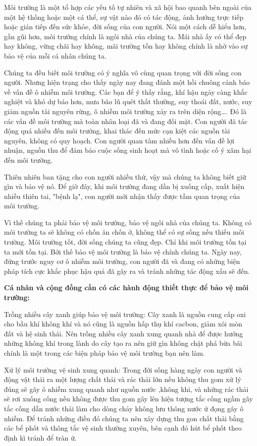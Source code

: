 \begin{enumerate}[label=\bfseries Câu \arabic*:]
{		Môi trường là một tổ hợp các yếu tố tự nhiên và xã hội bao quanh bên ngoài của một hệ thống hoặc một cá thể, sự vật nào đó có tác động, ảnh hưởng trực tiếp hoặc gián tiếp đến sức khỏe, đời sống của con người. Nói một cách dễ hiểu hơn, gần gũi hơn, môi trường chính là ngôi nhà của chúng ta. Mái nhà ấy có thể đẹp hay không, vững chãi hay không, mãi trường tồn hay không chính là nhờ vào sự bảo vệ của mỗi cá nhân chúng ta.
		
		
		
		Chúng ta đều biết môi trường có ý nghĩa vô cùng quan trọng với đời sống con người. Nhưng hiện trạng cho thấy ngày nay đang đánh một hồi chuông cảnh báo về vấn đề ô nhiễm môi trường. Các bạn để ý thấy rằng, khí hậu ngày càng khắc nghiệt và khó dự báo hơn, mưa bão lũ quét thất thường, suy thoái đất, nước, suy giảm nguồn tài nguyên rừng, ô nhiễm môi trường xảy ra trên diện rộng…. Đó là các vấn đề môi trường mà toàn nhân loại đã và đang đối mặt. Con người đã tác động quá nhiều đến môi trường, khai thác đến mức cạn kiệt các nguồn tài nguyên, không có quy hoạch. Con người quan tâm nhiều hơn đến vấn đề lợi nhuận, nguồn thu để đảm bảo cuộc sống sinh hoạt mà vô tình hoặc cố ý xâm hại đến môi trường.
		
		Thiên nhiên ban tặng cho con người nhiều thứ, vậy mà chúng ta không biết giữ gìn và bảo vệ nó. Để giờ đây, khi môi trường đang dần bị xuống cấp, xuất hiện nhiều thiên tai, "bệnh lạ", con người mới nhận thấy được tầm quan trọng của môi trường.
		
		Vì thế chúng ta phải bảo vệ môi trường, bảo vệ ngôi nhà của chúng ta. Không có môi trường ta sẽ không có chốn ăn chốn ở, không thể có sự sống nếu thiếu môi trường. Môi trường tốt, đời sống chúng ta cũng đẹp. Chỉ khi môi trường tồn tại ta mới tồn tại. Bởi thế bảo vệ môi trường là bảo vệ chính chúng ta. Ngày nay, đứng trước nguy cơ ô nhiễm môi trường, con người đã và đang có những biện pháp tích cực khắc phục hậu quả đã gây ra và tránh những tác động xấu sẽ đến.
		
		\textbf{Cá nhân và cộng đồng cần có các hành động thiết thực để bảo vệ môi trường:}
		
		Trồng nhiều cây xanh giúp bảo vệ môi trường: Cây xanh là nguồn cung cấp oxi cho bầu khí không khí và nó cũng là nguồn hấp thụ khí cacbon, giảm xói mòn đất và hệ sinh thái. Nên trồng nhiều cây xanh xung quanh nhà để được hưởng những không khí trong lành do cây tạo ra nên giữ gìn không chặt phá bừa bãi chính là một trong các biện pháp bảo vệ môi trường bạn nên làm.
		
		Xử lý môi trường vệ sinh xung quanh: Trong đời sống hàng ngày con người và động vật thải ra một lượng chất thải và rác thải lớn nếu không thu gom xử lý đúng sẽ gây ô nhiễm xung quanh như nguồn nước ,không khi, và những rác thải sẽ rơi xuống cống nếu không được thu gom gây lên hiện tượng tắc cống ngầm gây tắc cống dẫn nước thải làm cho dòng chảy không lưu thông nước ứ đọng gây ô nhiễm. Để tránh những điều đó chúng ta nên xây dựng thu gon chất thải bằng các bể phốt và thông tắc vệ sinh thường xuyên, bên cạnh đó hút bể phốt theo định kì tránh để tràn ứ.
		
}
\end{enumerate}
